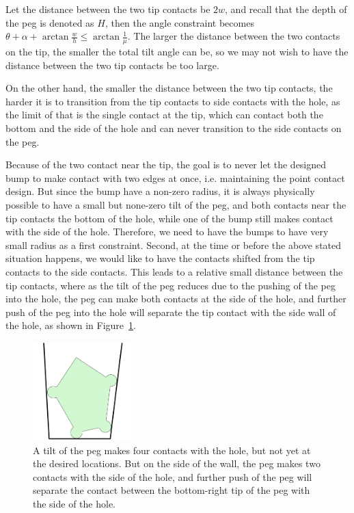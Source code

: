 \documentclass[11pt, twocolumn]{article}
\begin{document}
Let the distance between the two tip contacts be $2w$, and recall that the depth of the peg is denoted as $H$, then the angle constraint becomes $\theta+\alpha+\arctan{\frac{w}{h}} \leq \arctan{\frac{1}{\mu}}$. The larger the distance between the two contacts on the tip, the smaller the total tilt angle can be, so we may not wish to have the distance between the two tip contacts be too large. 

On the other hand, the smaller the distance between the two tip contacts, the harder it is to transition from the tip contacts to side contacts with the hole, as the limit of that is the single contact at the tip, which can contact both the bottom and the side of the hole and can never transition to the side contacts on the peg. 

Because of the two contact near the tip, the goal is to never let the designed bump to make contact with two edges at once, i.e. maintaining the point contact design. But since the bump have a non-zero radius, it is always physically possible to have a small but none-zero tilt of the peg, and both contacts near the tip contacts the bottom of the hole, while one of the bump still makes contact with the side of the hole. Therefore, we need to have the bumps to have very small radius as a first constraint. Second, at the time or before the above stated situation happens, we would like to have the contacts shifted from the tip contacts to the side contacts. This leads to a relative small distance between the tip contacts, where as the tilt of the peg reduces due to the pushing of the peg into the hole, the peg can make both contacts at the side of the hole, and further push of the peg into the hole will separate the tip contact with the side wall of the hole, as shown in Figure~\ref{fig:four_contact_tilt}. 

\begin{figure}
\begin{center}
\includegraphics[width=1.5in]{figures/four_contact_tilt.png}
\end{center}
\caption{A tilt of the peg makes four contacts with the hole, but not yet at the desired locations. But on the side of the wall, the peg makes two contacts with the side of the hole, and further push of the peg will separate the contact between the bottom-right tip of the peg with the side of the hole. }
\label{fig:four_contact_tilt}
\end{figure}
\end{document}

